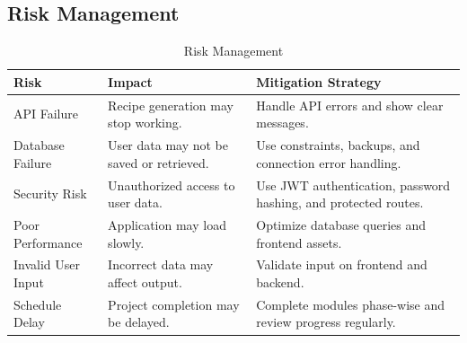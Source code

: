 \FloatBarrier
\subsection{Risk Management}
\begin{table}[h]
\centering
\caption{Risk Management}
\begin{tabularx}{\textwidth}{|p{3.6cm}|p{4cm}|X|}
\hline
\textbf{Risk} & \textbf{Impact} & \textbf{Mitigation Strategy} \\
\hline
API Failure & Recipe generation may stop working. & Handle API errors and show clear messages. \\
\hline
Database Failure & User data may not be saved or retrieved. & Use constraints, backups, and connection error handling. \\
\hline
Security Risk & Unauthorized access to user data. & Use JWT authentication, password hashing, and protected routes. \\
\hline
Poor Performance & Application may load slowly. & Optimize database queries and frontend assets. \\
\hline
Invalid User Input & Incorrect data may affect output. & Validate input on frontend and backend. \\
\hline
Schedule Delay & Project completion may be delayed. & Complete modules phase-wise and review progress regularly. \\
\hline
\end{tabularx}
\end{table}
\FloatBarrier
